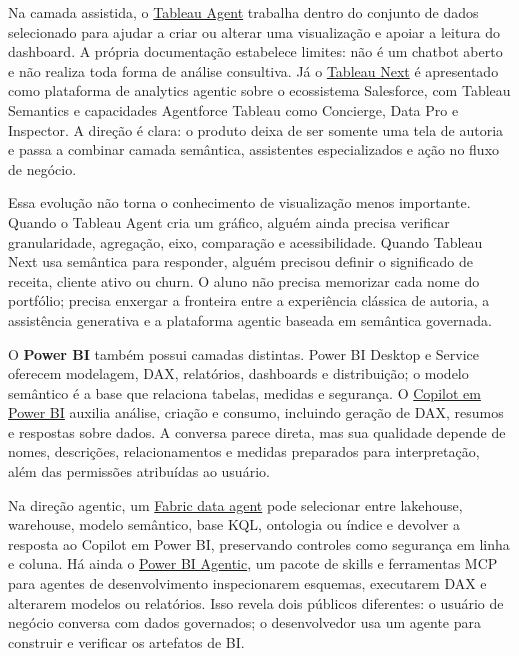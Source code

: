 Na camada assistida, o \href{https://help.tableau.com/current/online/en-us/web_author_einstein.htm}{Tableau Agent} trabalha dentro do conjunto de dados selecionado para ajudar a criar ou alterar uma visualização e apoiar a leitura do dashboard. A própria documentação estabelece limites: não é um chatbot aberto e não realiza toda forma de análise consultiva. Já o \href{https://help.tableau.com/current/tableau-next/en-us/tableau_next_tableau_product_overview.htm}{Tableau Next} é apresentado como plataforma de analytics agentic sobre o ecossistema Salesforce, com Tableau Semantics e capacidades Agentforce Tableau como Concierge, Data Pro e Inspector. A direção é clara: o produto deixa de ser somente uma tela de autoria e passa a combinar camada semântica, assistentes especializados e ação no fluxo de negócio.

Essa evolução não torna o conhecimento de visualização menos importante. Quando o Tableau Agent cria um gráfico, alguém ainda precisa verificar granularidade, agregação, eixo, comparação e acessibilidade. Quando Tableau Next usa semântica para responder, alguém precisou definir o significado de receita, cliente ativo ou churn. O aluno não precisa memorizar cada nome do portfólio; precisa enxergar a fronteira entre a experiência clássica de autoria, a assistência generativa e a plataforma agentic baseada em semântica governada.

O \textbf{Power BI} também possui camadas distintas. Power BI Desktop e Service oferecem modelagem, DAX, relatórios, dashboards e distribuição; o modelo semântico é a base que relaciona tabelas, medidas e segurança. O \href{https://learn.microsoft.com/en-us/power-bi/create-reports/copilot-introduction}{Copilot em Power BI} auxilia análise, criação e consumo, incluindo geração de DAX, resumos e respostas sobre dados. A conversa parece direta, mas sua qualidade depende de nomes, descrições, relacionamentos e medidas preparados para interpretação, além das permissões atribuídas ao usuário.

Na direção agentic, um \href{https://learn.microsoft.com/en-us/fabric/data-science/data-agent-copilot-powerbi}{Fabric data agent} pode selecionar entre lakehouse, warehouse, modelo semântico, base KQL, ontologia ou índice e devolver a resposta ao Copilot em Power BI, preservando controles como segurança em linha e coluna. Há ainda o \href{https://learn.microsoft.com/en-us/power-bi/developer/agentic/power-bi-agentic-overview}{Power BI Agentic}, um pacote de skills e ferramentas MCP para agentes de desenvolvimento inspecionarem esquemas, executarem DAX e alterarem modelos ou relatórios. Isso revela dois públicos diferentes: o usuário de negócio conversa com dados governados; o desenvolvedor usa um agente para construir e verificar os artefatos de BI.


